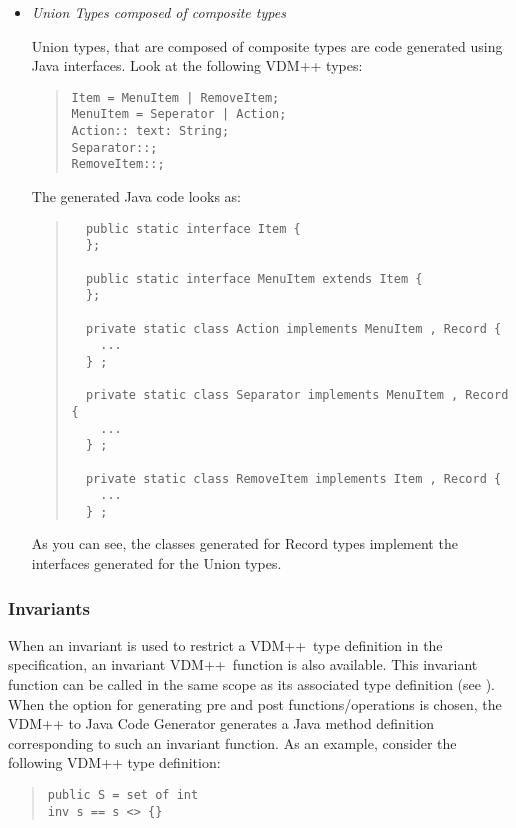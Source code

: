 \documentclass[\pformat,11pt]{article}
\newcommand{\langmancite}{\cite{LangManPP-CSK}}
\newcommand{\VDM}{VDM++}
\newcommand{\cg}{VDM++ to Java Code Generator}
\begin{document}
\begin{itemize}
\item {\em Union Types composed of composite types}

Union types, that are composed of composite types are code generated using Java interfaces. Look at the following VDM++ types:

\begin{quote}
\begin{verbatim}
Item = MenuItem | RemoveItem;
MenuItem = Seperator | Action;
Action:: text: String;
Separator::;
RemoveItem::;
\end{verbatim}
\end{quote}

The generated Java code looks as:

\begin{quote}
\begin{small}  
\begin{verbatim}
  public static interface Item {
  };

  public static interface MenuItem extends Item {
  };

  private static class Action implements MenuItem , Record {
    ...
  } ;

  private static class Separator implements MenuItem , Record {
    ...
  } ;

  private static class RemoveItem implements Item , Record {
    ...
  } ;
\end{verbatim}
\end{small}  
\end{quote}

As you can see, the classes generated for Record types implement the interfaces generated for the Union types.
\end{itemize}

\subsubsection{Invariants }

When an invariant is used to restrict a \VDM\ type definition in the
specification, an invariant \VDM\ function is also available. This
invariant function can be called in the same scope as its associated
type definition (see \langmancite). When the option for generating pre
and post functions/operations is
chosen, the \cg{} generates a Java method definition corresponding to
such an invariant function. As an
example, consider the following \VDM{} type definition:

\begin{quote}
\begin{verbatim}
public S = set of int
inv s == s <> {}
\end{verbatim}
\end{quote}
\end{document}
